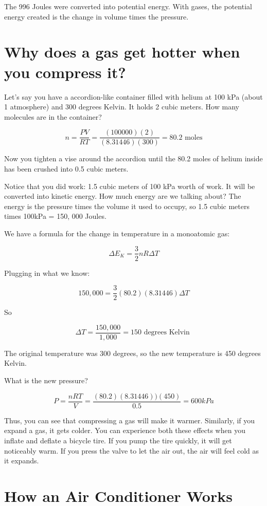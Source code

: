 The 996 Joules were converted into potential energy.   With gases, the potential energy created is the change in volume times the pressure.   

\section{Why does a gas get hotter when you compress it?}

Let's say you have a accordion-like container filled with helium at 100 kPa (about 1 atmosphere) and 300 degrees Kelvin.  It holds 2 cubic meters.  
How many molecules are in the container?

$$n = \frac{PV}{RT} = \frac{(100000)(2)}{(8.31446)(300)} = 80.2 \text{ moles}$$

Now you tighten a vise around the accordion until the 80.2 moles of helium inside has been crushed into 0.5 cubic meters. 

Notice that you did work: 1.5 cubic meters of 100 kPa worth of work.   It will be converted into kinetic energy.  How much energy are we talking about?  
The energy is the pressure times the volume it used to occupy,  so 1.5 cubic meters times 100kPa = 150, 000 Joules.

We have a formula for the change in temperature in a monoatomic gas:

$$ \Delta E_K = \frac{3}{2} n R \Delta T$$

Plugging in what we know:

$$150,000 = \frac{3}{2} (80.2) (8.31446) \Delta T$$

So 

$$\Delta T = \frac{150,000}{1,000} = 150 \text{ degrees Kelvin }$$

The original temperature was 300 degrees,  so the new temperature is 450 degrees Kelvin.

What is the new pressure?

$$P = \frac{n R T}{V}  =  \frac{(80.2) (8.31446))(450)}{0.5} = 600 kPa$$

Thus,  you can see that compressing a gas will make it warmer.  Similarly,   if you expand a gas, it gets colder.  You can experience both these effects when you inflate and deflate a bicycle tire.   If you pump the tire quickly,  it will get noticeably warm.   If you press the valve to let the air out,  the air will feel cold as it expands.

\section{How an Air Conditioner Works}

